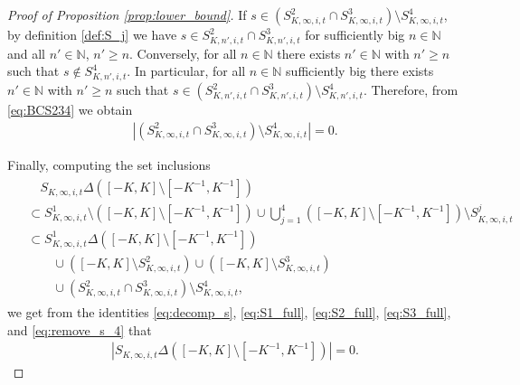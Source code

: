 \documentclass[11pt]{article}
\numberwithin{statement}{section}
\numberwithin{equation}{section}
\theoremstyle{remark}
\newcommand{\N}{\mathbb N}
\begin{document}
\begin{proof}[Proof of Proposition \ref{prop:lower_bound}]
	If
        $s \in \left( S^2_{K,\infty,i,t} \cap S^3_{K,\infty,i,t}
        \right) \setminus S^4_{K,\infty,i,t} $, by definition
        \eqref{def:S_j} we have
        $s \in S^2_{K,n',i,t} \cap S^3_{K,n',i,t}$ for sufficiently
        big $n \in \N$ and all $n' \in \N$, $n'\geq
        n$. Conversely, for all $n \in \N$ there exists
        $n' \in \N$ with $n' \geq n$ such that
        $s \not\in S^4_{K,n',i,t}$. In particular, for all $n \in \N$
        sufficiently big there exists $n' \in \N$ with
        $n' \geq n$ such that
        $ s\in \left(S^2_{K,n',i,t} \cap S^3_{K,n',i,t} \right)
        \setminus S^4_{K,n',i,t}$. Therefore, from \eqref{eq:BCS234}
        we obtain
	\begin{align}\label{eq:remove_s_4}
		\left|  \left( S^2_{K,\infty,i,t} \cap
          S^3_{K,\infty,i,t} \right)  \setminus S^4_{K,\infty,i,t}
          \right| =0. 
	\end{align}
	
	Finally, computing the set inclusions 
	\begin{align}
	  \begin{split}
            & \quad S_{K,\infty,i,t} \Delta \left( [-K,K] \setminus
              [-K^{-1},K^{-1}]\right) \\ 
            & \subset S^1_{K,\infty,i,t}  \setminus  \left( [-K,K]
              \setminus [-K^{-1},K^{-1}]\right) \cup \bigcup_{j=1}^4
            \left( [-K,K] \setminus [-K^{-1},K^{-1}]\right) \setminus
            S^j_{K,\infty,i,t}\\ 
            & \subset S^1_{K,\infty,i,t}  \Delta  \left( [-K,K]
              \setminus [-K^{-1},K^{-1}]\right) \\ 
            & \qquad \cup \left( [-K,K] \setminus
              S^2_{K,\infty,i,t}\right) \cup \left( [-K,K] \setminus
              S^3_{K,\infty,i,t}\right) \\ 
            & \qquad \cup \left( S^2_{K,\infty,i,t} \cap
              S^3_{K,\infty,i,t} \right) \setminus S^4_{K,\infty,i,t}, 
	  \end{split}
	\end{align}
	we get from the identities \eqref{eq:decomp_s},
        \eqref{eq:S1_full}, \eqref{eq:S2_full}, \eqref{eq:S3_full},
        and \eqref{eq:remove_s_4} that
	\begin{align}\label{eq:S_total}
          \left|S_{K,\infty,i,t} \Delta \left( [-K,K] \setminus
          [-K^{-1},K^{-1}]\right)\right| = 0. 
	\end{align}


\end{proof}
\end{document}
